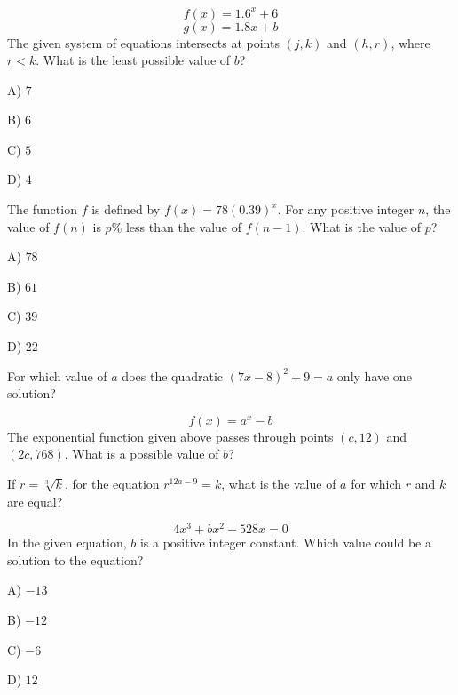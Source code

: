 \vfill
\noindent\begin{minipage}{\linewidth}
\par\smallskip
$$f(x)=1.6^x+6$$ $$g(x)=1.8x+b$$ The given system of equations intersects at points $(j,k)$ and $(h,r)$, where $r<k$. What is the least possible value of $b$?
\begin{satchoices}
  \item[A)] $7$
  \item[B)] $6$
  \item[C)] $5$
  \item[D)] $4$
\end{satchoices}
\end{minipage}
\vfill
\clearpage
\noindent\begin{minipage}{\linewidth}
\par\smallskip
The function $f$ is defined by $f(x)=78(0.39)^x$. For any positive integer $n$, the value of $f(n)$ is $p\%$ less than the value of $f(n-1)$. What is the value of $p$?
\begin{satchoices}
  \item[A)] $78$
  \item[B)] $61$
  \item[C)] $39$
  \item[D)] $22$
\end{satchoices}
\end{minipage}
\vfill
\noindent\begin{minipage}{\linewidth}
\par\smallskip
For which value of $a$ does the quadratic $(7x-8)^2+9=a$ only have one solution?
\end{minipage}
\vfill
\noindent\begin{minipage}{\linewidth}
\par\smallskip
$$f(x)=a^x-b$$ The exponential function given above passes through points $(c,12)$ and $(2c,768)$. What is a possible value of $b$?
\end{minipage}
\vfill
\clearpage
\noindent\begin{minipage}{\linewidth}
\par\smallskip
If $r=\sqrt[3]{k}$, for the equation $r^{12a-9}=k$, what is the value of $a$ for which $r$ and $k$ are equal?
\end{minipage}
\vfill
\noindent\begin{minipage}{\linewidth}
\par\smallskip
$$4x^3+bx^2-528x=0$$ In the given equation, $b$ is a positive integer constant. Which value could be a solution to the equation?
\begin{satchoices}
  \item[A)] $-13$
  \item[B)] $-12$
  \item[C)] $-6$
  \item[D)] $12$
\end{satchoices}
\end{minipage}
